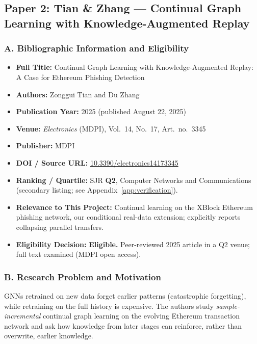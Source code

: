 \documentclass[11pt,a4paper]{article}
\begin{document}
\subsection{Paper 2: Tian \& Zhang --- Continual Graph Learning with Knowledge-Augmented Replay}
\label{sec:p2_kar}

\subsubsection*{A. Bibliographic Information and Eligibility}
\begin{itemize}[leftmargin=*]
    \item \textbf{Full Title:} Continual Graph Learning with Knowledge-Augmented Replay: A Case for Ethereum Phishing Detection
    \item \textbf{Authors:} Zonggui Tian and Du Zhang
    \item \textbf{Publication Year:} 2025 (published August 22, 2025)
    \item \textbf{Venue:} \textit{Electronics} (MDPI), Vol.~14, No.~17, Art.\ no.\ 3345
    \item \textbf{Publisher:} MDPI
    \item \textbf{DOI / Source URL:} \href{https://doi.org/10.3390/electronics14173345}{10.3390/electronics14173345}
    \item \textbf{Ranking / Quartile:} SJR \textbf{Q2}, Computer Networks and Communications (secondary listing; see Appendix~\ref{app:verification}).
    \item \textbf{Relevance to This Project:} Continual learning on the XBlock Ethereum phishing network, our conditional real-data extension; explicitly reports collapsing parallel transfers.
    \item \textbf{Eligibility Decision:} \textbf{Eligible.} Peer-reviewed 2025 article in a Q2 venue; full text examined (MDPI open access).
\end{itemize}

\subsubsection*{B. Research Problem and Motivation}
GNNs retrained on new data forget earlier patterns (catastrophic forgetting), while retraining on the full history is expensive. The authors study \emph{sample-incremental} continual graph learning on the evolving Ethereum transaction network and ask how knowledge from later stages can reinforce, rather than overwrite, earlier knowledge.
\end{document}
